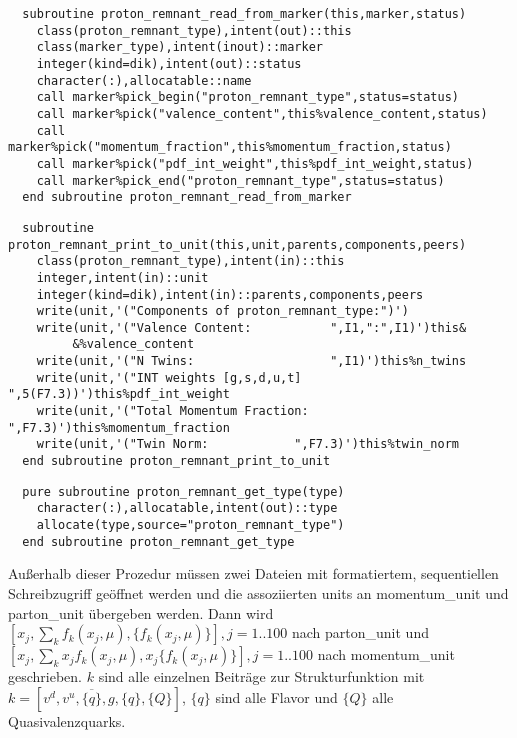 \begin{Verbatim}
  subroutine proton_remnant_read_from_marker(this,marker,status)
    class(proton_remnant_type),intent(out)::this
    class(marker_type),intent(inout)::marker
    integer(kind=dik),intent(out)::status
    character(:),allocatable::name
    call marker%pick_begin("proton_remnant_type",status=status)
    call marker%pick("valence_content",this%valence_content,status)
    call marker%pick("momentum_fraction",this%momentum_fraction,status)
    call marker%pick("pdf_int_weight",this%pdf_int_weight,status)
    call marker%pick_end("proton_remnant_type",status=status)
  end subroutine proton_remnant_read_from_marker
\end{Verbatim}

\begin{Verbatim}
  subroutine proton_remnant_print_to_unit(this,unit,parents,components,peers)
    class(proton_remnant_type),intent(in)::this
    integer,intent(in)::unit
    integer(kind=dik),intent(in)::parents,components,peers
    write(unit,'("Components of proton_remnant_type:")')
    write(unit,'("Valence Content:           ",I1,":",I1)')this&
         &%valence_content
    write(unit,'("N Twins:                   ",I1)')this%n_twins
    write(unit,'("INT weights [g,s,d,u,t]    ",5(F7.3))')this%pdf_int_weight
    write(unit,'("Total Momentum Fraction:   ",F7.3)')this%momentum_fraction
    write(unit,'("Twin Norm:            ",F7.3)')this%twin_norm
  end subroutine proton_remnant_print_to_unit
\end{Verbatim}
\begin{Verbatim}
  pure subroutine proton_remnant_get_type(type)
    character(:),allocatable,intent(out)::type
    allocate(type,source="proton_remnant_type")
  end subroutine proton_remnant_get_type
\end{Verbatim}
Außerhalb dieser Prozedur müssen zwei Dateien mit formatiertem, sequentiellen Schreibzugriff geöffnet werden und die assoziierten units an momentum\_unit und parton\_unit übergeben werden. Dann wird $[x_j,\sum_k f_k(x_j,\mu),\{f_k(x_j,\mu)\}],j=1..100$ nach parton\_unit und $[x_j,\sum_k x_j f_k(x_j,\mu),x_j \{f_k(x_j,\mu)\}],j=1..100$ nach momentum\_unit geschrieben. $k$ sind alle einzelnen Beiträge zur Strukturfunktion mit $k=[v^d,v^u,\overline{\{q\}},g,\{q\},\{Q\}]$, $\{q\}$ sind alle Flavor und $\{Q\}$ alle Quasivalenzquarks.
